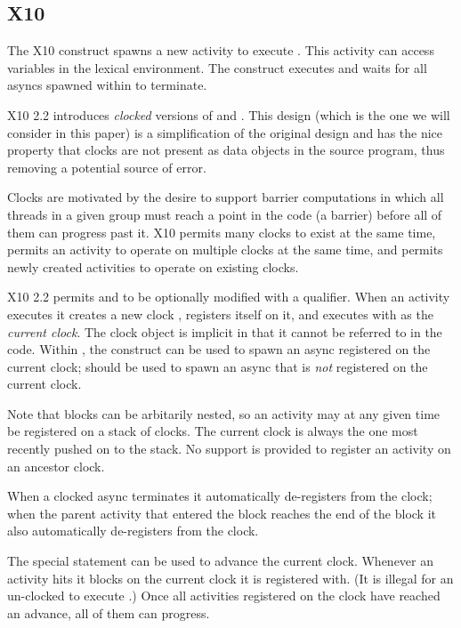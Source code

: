 \subsection{X10}

The X10 construct  spawns a new activity to execute
. This activity can access variables in the lexical
environment. The construct  executes  and waits
for all asyncs spawned within  to terminate.

X10 2.2 introduces {\em clocked} versions of  and
. This design (which is the one we will consider in this
paper) is a simplification of the original design and has the nice
property that clocks are not present as data objects in the source
program, thus removing a potential source of error.

Clocks are motivated by the desire to support barrier computations in
which all threads in a given group must reach a point in the code (a
barrier) before all of them can progress past it. X10 permits many
clocks to exist at the same time, permits an activity to operate on
multiple clocks at the same time, and permits newly created activities
to operate on existing clocks.

X10 2.2 permits  and  to be optionally
modified with a  qualifier.  When an activity executes
 it creates a new clock , registers
itself on it, and executes  with  as the {\em
  current clock}.  The clock object is implicit in that it cannot be
referred to in the code.  Within , the 
construct can be used to spawn an async registered on the current
clock;  should be used to spawn an async that is {\em
  not} registered on the current clock.

Note that  blocks can be arbitarily nested, so an
activity may at any given time be registered on a stack of clocks. The
current clock is always the one most recently pushed on to the stack.
No support is provided to register an activity on an ancestor
clock.

When a clocked async terminates it automatically de-registers from the
clock; when the parent activity that entered the 
block reaches the end of the block it also automatically de-registers
from the clock.

The special statement  can be used to advance the
current clock.  Whenever an activity hits  it blocks on
the current clock it is registered with. (It is illegal for an
un-clocked  to execute .) Once all
activities registered on the clock have reached an advance, all of
them can progress.

